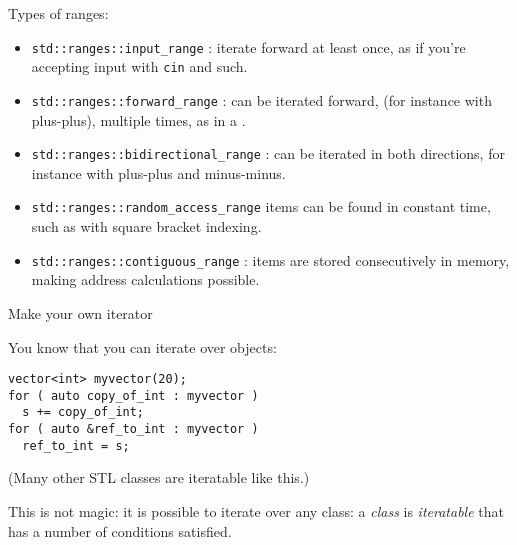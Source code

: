 Types of ranges:
\begin{itemize}
\item \lstinline+std::ranges::input_range+ : iterate forward at least once,
  as if you're accepting input with \lstinline{cin} and such.
\item \lstinline+std::ranges::forward_range+ : can be iterated forward,
  (for instance with plus-plus), multiple times,
  as in a .
\item \lstinline+std::ranges::bidirectional_range+ : can be iterated in both
  directions, for instance with plus-plus and minus-minus.
\item \lstinline+std::ranges::random_access_range+ items can be found
  in constant time, such as with square bracket indexing.
\item \lstinline+std::ranges::contiguous_range+ : items
  are stored consecutively in memory, making address calculations possible.
\end{itemize}

 {Make your own iterator}
\label{sec:range-iter}

You know that you can iterate over  objects:
\begin{lstlisting}
vector<int> myvector(20);
for ( auto copy_of_int : myvector )
  s += copy_of_int;
for ( auto &ref_to_int : myvector )
  ref_to_int = s;
\end{lstlisting}
(Many other \ac{STL} classes are iteratable like this.)

This is not magic: it is possible to iterate over any class:
a \emph{class} is 
\emph{iteratable} that has a number of conditions satisfied.

